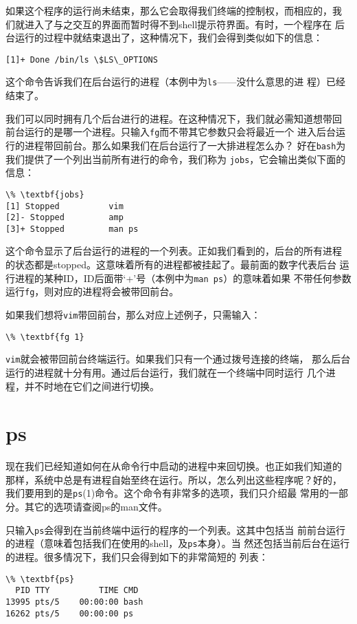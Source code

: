 如果这个程序的运行尚未结束，那么它会取得我们终端的控制权，而相应的，我
们就进入了与之交互的界面而暂时得不到shell提示符界面。有时，一个程序在
后台运行的过程中就结束退出了，这种情况下，我们会得到类似如下的信息：
\begin{Verbatim}[frame=single, commandchars=\\\{\}]
[1]+ Done /bin/ls \$LS\_OPTIONS
\end{Verbatim}
这个命令告诉我们在后台运行的进程（本例中为\texttt{ls}——没什么意思的进
程）已经结束了。

我们可以同时拥有几个后台进行的进程。在这种情况下，我们就必需知道想带回
前台运行的是哪一个进程。只输入\texttt{fg}而不带其它参数只会将最近一个
进入后台运行的进程带回前台。那么如果我们在后台运行了一大排进程怎么办？
好在\texttt{bash}为我们提供了一个列出当前所有进行的命令，我们称为
\texttt{jobs}，它会输出类似下面的信息：
\begin{Verbatim}[frame=single, commandchars=\\\{\}]
\% \textbf{jobs}
[1] Stopped          vim
[2]- Stopped         amp
[3]+ Stopped         man ps
\end{Verbatim}
这个命令显示了后台运行的进程的一个列表。正如我们看到的，后台的所有进程
的状态都是stopped。这意味着所有的进程都被挂起了。最前面的数字代表后台
运行进程的某种ID，ID后面带`+'号（本例中为\texttt{man ps}）的意味着如果
不带任何参数运行\texttt{fg}，则对应的进程将会被带回前台。

如果我们想将\texttt{vim}带回前台，那么对应上述例子，只需输入：
\begin{Verbatim}[frame=single, commandchars=\\\{\}]
\% \textbf{fg 1}
\end{Verbatim}
\texttt{vim}就会被带回前台终端运行。如果我们只有一个通过拨号连接的终端，
那么后台运行的进程就十分有用。通过后台运行，我们就在一个终端中同时运行
几个进程，并不时地在它们之间进行切换。


\section{ps}
\label{sec:processControl:ps}
现在我们已经知道如何在从命令行中启动的进程中来回切换。也正如我们知道的
那样，系统中总是有进程自始至终在运行。所以，怎么列出这些程序呢？好的，
我们要用到的是\texttt{ps}(1)命令。这个命令有非常多的选项，我们只介绍最
常用的一部分。其它的选项请查阅ps的man文件。

只输入\texttt{ps}会得到在当前终端中运行的程序的一个列表。这其中包括当
前前台运行的进程（意味着包括我们在使用的shell，及\texttt{ps}本身）。当
然还包括当前后台在运行的进程。很多情况下，我们只会得到如下的非常简短的
列表：
\begin{Verbatim}[frame=single, commandchars=\\\{\}]
\% \textbf{ps}
  PID TTY          TIME CMD
13995 pts/5    00:00:00 bash
16262 pts/5    00:00:00 ps
\end{Verbatim}

